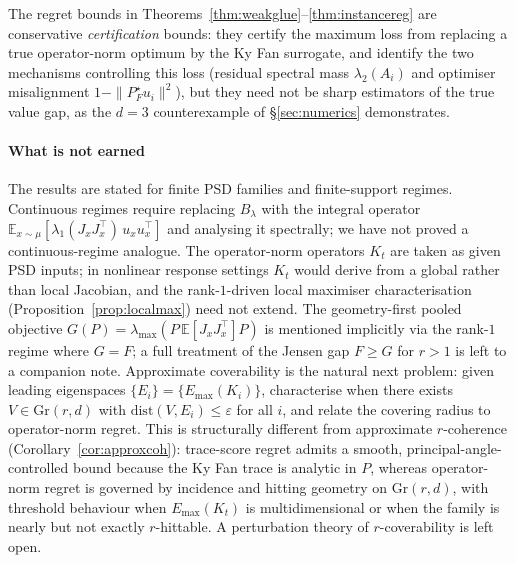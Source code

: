 \documentclass[final,3p,times]{elsarticle}
\newcommand{\Gr}{\mathrm{Gr}}
\newcommand{\E}{\mathbb{E}}
\newcommand{\Emax}{E_{\max}}
\begin{document}
The regret bounds in
Theorems~\ref{thm:weakglue}--\ref{thm:instancereg} are conservative
\emph{certification} bounds: they certify the maximum loss from
replacing a true operator-norm optimum by the Ky Fan surrogate, and
identify the two mechanisms controlling this loss (residual spectral
mass $\lambda_2(A_i)$ and optimiser misalignment $1-\|P_F^\star u_i\|^2$),
but they need not be sharp estimators of the true value gap, as the
$d=3$ counterexample of \S\ref{sec:numerics} demonstrates.

\paragraph{What is not earned}
The results are stated for finite PSD families and finite-support
regimes.
Continuous regimes require replacing $B_\lambda$ with the integral
operator
$\E_{x\sim\mu}[\lambda_1(J_xJ_x^\top)\,u_xu_x^\top]$ and analysing it
spectrally; we have not proved a continuous-regime analogue.
The operator-norm operators $K_t$ are taken as given PSD inputs; in
nonlinear response settings $K_t$ would derive from a global rather
than local Jacobian, and the rank-$1$-driven local maximiser
characterisation (Proposition~\ref{prop:localmax}) need not extend.
The geometry-first pooled objective $G(P)=\lambda_{\max}(P\,\E[J_xJ_x^\top]P)$
is mentioned implicitly via the rank-$1$ regime where $G=F$; a full
treatment of the Jensen gap $F\ge G$ for $r>1$ is left to a companion
note.
Approximate coverability is the natural next problem: given leading
eigenspaces $\{E_i\}=\{\Emax(K_i)\}$, characterise when there exists
$V\in\Gr(r,d)$ with $\mathrm{dist}(V,E_i)\le\varepsilon$ for all $i$,
and relate the covering radius to operator-norm regret.
This is structurally different from approximate $r$-coherence
(Corollary~\ref{cor:approxcoh}): trace-score regret admits a smooth,
principal-angle-controlled bound because the Ky Fan trace is analytic
in $P$, whereas operator-norm regret is governed by incidence and
hitting geometry on $\Gr(r,d)$, with threshold behaviour when
$\Emax(K_t)$ is multidimensional or when the family is nearly but not
exactly $r$-hittable.
A perturbation theory of $r$-coverability is left open.
\end{document}
